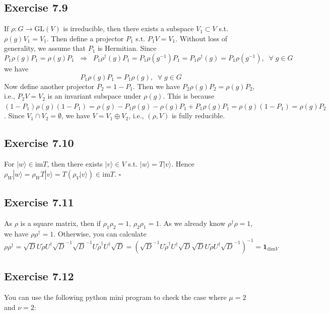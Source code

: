 \documentclass[]{ctexart}
\begin{document}
\subsection{Exercise 7.9}
If $\rho:G\to\text{GL}(V)$ is irreducible, then there exists a subspace $V_1\subset V$ s.t. $\rho(g)V_1=V_1$. Then define a projector $P_1$ s.t. 
$P_1V=V_1$. Without loss of generality, we assume that $P_1$ is Hermitian. Since 
\begin{equation*}
P_1\rho(g)P_1=\rho(g)P_1\;\;\Rightarrow\;\;P_1\rho^\dagger(g)P_1=P_1\rho(g^{-1})P_1=P_1\rho^\dagger(g)=P_1\rho(g^{-1}),\;\;\forall\;g\in G
\end{equation*}
we have 
\begin{equation*}
P_1\rho(g)P_1=P_1\rho(g),\;\;\forall\;g\in G
\end{equation*}
Now define another projector $P_2=1-P_1$. Then we have $P_2\rho(g)P_2=\rho(g)P_2$, i.e., $P_2V=V_2$ is an invariant subspace under $\rho(g)$. 
This is because $(1-P_1)\rho(g)(1-P_1)=\rho(g)-P_1\rho(g)-\rho(g)P_1+P_1\rho(g)P_1=\rho(g)(1-P_1)=\rho(g)P_2$. 
Since $V_1\cap V_2=\emptyset$, we have $V=V_1\oplus V_2$, i.e., $(\rho,V)$ is fully reducible. 
\subsection{Exercise 7.10}
For $|w\rangle\in\text{im}T$, then there exists $|v\rangle\in V$ s.t. $|w\rangle=T|v\rangle$. Hence $\rho_W|w\rangle=\rho_W T|v\rangle=T(\rho_V|v\rangle)\in\text{im}T$. $\square$
\subsection{Exercise 7.11}
As $\rho$ is a square matrix, then if $\rho_1\rho_2=1$, $\rho_2\rho_1=1$. As we already know $\rho^\dagger\rho=1$, we have $\rho\rho^\dagger=1$. 
Otherwise, you can calculate 
\begin{equation*}
\rho\rho^\dagger=\sqrt{D}U\tilde{\rho}U^\dagger\sqrt{D}^{-1}\sqrt{D}^{-1}U\tilde{\rho}^\dagger U^\dagger\sqrt{D}=\left(\sqrt{D}^{-1}U\tilde{\rho}^\dagger U^\dagger\sqrt{D}\sqrt{D}U\tilde{\rho}U^\dagger\sqrt{D}^{-1}\right)^{-1}=\mathbf 1_{\text{dim}V}
\end{equation*}
\subsection{Exercise 7.12}
You can use the following python mini program to check the case where $\mu=2$ and $\nu=2$: 
\end{document}
